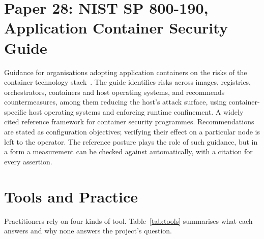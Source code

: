 \section{Paper 28: NIST SP 800-190, Application Container Security Guide}
\label{lit:nist}

 Guidance for organisations adopting application containers on the risks of the container technology stack~\cite{nist800190}.
 The guide identifies risks across images, registries, orchestrators, containers and host operating systems, and recommends countermeasures, among them reducing the host's attack surface, using container-specific host operating systems and enforcing runtime confinement.
 A widely cited reference framework for container security programmes.
 Recommendations are stated as configuration objectives; verifying their effect on a particular node is left to the operator.
 The reference posture plays the role of such guidance, but in a form a measurement can be checked against automatically, with a citation for every assertion.

\section{Tools and Practice}
\label{lit:tools}

Practitioners rely on four kinds of tool. Table~\ref{tab:tools} summarises what each answers and why none answers the project's question.

